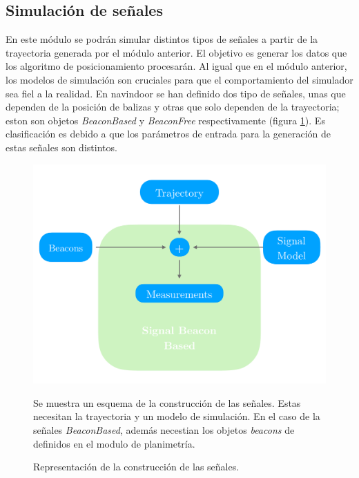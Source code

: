 
\subsection{Simulación de señales}

En este módulo se podrán simular distintos tipos de señales a partir de la trayectoria generada por el módulo anterior. El objetivo es generar los datos que los algoritmo de posicionamiento procesarán. Al igual que en el módulo anterior, los modelos de simulación son cruciales para que el comportamiento del simulador sea fiel a la realidad. 
En navindoor se han definido dos tipo de señales, unas que dependen de la posición de balizas y otras que solo dependen de la trayectoria; eston son objetos \emph{BeaconBased} y \emph{BeaconFree} respectivamente (figura \ref{schemaBB}). Es clasificación es debido a que los parámetros de entrada para la generación de estas señales son distintos.

\begin{figure}[ht!]
    \centering
        \includegraphics[width=0.8\columnwidth]{img/Design/4.pdf}
        \caption{Representación de la construcción de las señales.}
        \footnotesize
        Se muestra un esquema de la construcción de las señales. Estas necesitan la trayectoria y un modelo de simulación. En el caso de la señales \emph{BeaconBased}, además necestian los objetos \emph{beacons} de definidos en el modulo de planimetría.
        \label{schemaBB}
    \end{figure}















